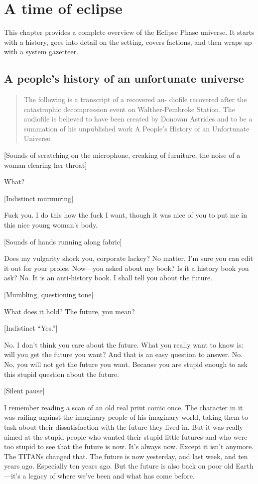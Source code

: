 \chapter{A time of eclipse}
\label{chap:a-time-of-eclipse}

This chapter provides a complete overview of the Eclipse Phase
universe. It starts with a history, goes into detail on the setting,
covers factions, and then wraps up with a system gazetteer.

\section{A people's history of an unfortunate universe}
\label{sec:peoples-history-an}

\begin{quotation} 
  The following is a transcript of a recovered au- diofile recovered
  after the catastrophic decompression event on Walther-Pembroke
  Station.  The audiofile is believed to have been created by Donovan
  Astrides and to be a summation of his unpublished work A People's
  History of an Unfortunate Universe.
\end{quotation}

[Sounds of scratching on the microphone, creaking of furniture, the
noise of a woman clearing her throat]

What?

[Indistinct murmuring]

Fuck you. I do this how the fuck I want, though it was nice of you to
put me in this nice young woman's body.

[Sounds of hands running along fabric]

Does my vulgarity shock you, corporate lackey? No matter, I'm sure you
can edit it out for your proles.  Now—you asked about my book? Is it a
history book you ask? No. It is an anti-history book. I shall tell you
about the future.

[Mumbling, questioning tone]

What does it hold? The future, you mean?

[Indistinct “Yes.”]

No. I don't think you care about the future. What you really want to
know is: will you get the future you want? And that is an easy
question to answer. No.  No, you will not get the future you
want. Because you are stupid enough to ask this stupid question about
the future.

[Silent pause]

I remember reading a scan of an old real print comic once. The
character in it was railing against the imaginary people of his
imaginary world, taking them to task about their dissatisfaction with
the future they lived in. But it was really aimed at the stupid people
who wanted their stupid little futures and who were too stupid to see
that the future is now. It's always now. Except it isn't anymore. The
TITANs changed that. The future is now yesterday, and last week, and
ten years ago. Especially ten years ago. But the future is also back
on poor old Earth—it's a legacy of where we've been and what has come
before.


